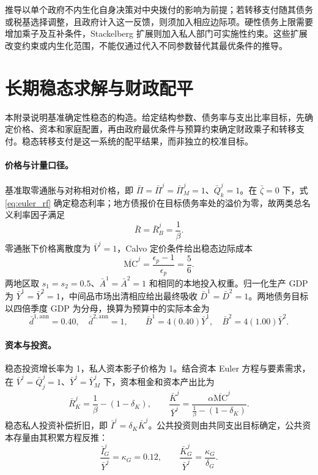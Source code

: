 \documentclass[12pt,UTF8]{ctexart}
\newcommand{\MC}{\mathrm{MC}}
\begin{document}
	推导以单个政府不内生化自身决策对中央拨付的影响为前提；若转移支付随其债务或税基选择调整，且政府计入这一反馈，则须加入相应边际项。硬性债务上限需要增加乘子及互补条件，Stackelberg 扩展则加入私人部门可实施性约束。这些扩展改变约束或内生化范围，不能仅通过代入不同参数替代其最优条件的推导。
	
	\section{长期稳态求解与财政配平}
	\label{app:steady_state}
	
	本附录说明基准确定性稳态的构造。给定结构参数、债务率与支出比率目标，先确定价格、资本和家庭配置，再由政府最优条件与预算约束确定财政乘子和转移支付。稳态转移支付是这一系统的配平结果，而非独立的校准目标。
	
	\paragraph{价格与计量口径。}
	基准取零通胀与对称相对价格，即 $\bar\Pi=\bar\Pi^j=\bar\Pi_M^j=1$、$\bar Q_k^j=1$。在 $\bar\zeta=0$ 下，式 \eqref{eq:euler_rf} 确定稳态利率；地方债报价在目标债务率处的溢价为零，故两类总名义利率因子满足
	\begin{equation}
		\bar{R} = \bar{R}_B^j = \frac{1}{\beta}.
	\end{equation}
	零通胀下价格离散度为 $\bar V^j=1$，Calvo 定价条件给出稳态边际成本
	\begin{equation}
		\overline{\MC}^j = \frac{\epsilon_p-1}{\epsilon_p} = \frac{5}{6}.
	\end{equation}
	两地区取 $s_1=s_2=0.5$、$\bar A^1=\bar A^2=1$ 和相同的本地投入权重。归一化生产 GDP 为 $\bar Y^1=\bar Y^2=1$，中间品市场出清相应给出最终吸收 $\bar D^1=\bar D^2=1$。两地债务目标以四倍季度 GDP 为分母，换算为预算中的实际本金为
	\begin{equation}
		\bar d^{1,\mathrm{ann}}=0.40,\quad \bar d^{2,\mathrm{ann}}=1,\qquad
		\bar B^1=4(0.40)\bar Y^1,\quad
		\bar B^2=4(1.00)\bar Y^2.
		\label{eq:ss_debt_frequency}
	\end{equation}
	
	\paragraph{资本与投资。}
	稳态投资增长率为 1，私人资本影子价格为 1。结合资本 Euler 方程与要素需求，在 $\bar V^j=\bar Q_j^j=1$、$\bar Y^j=\bar Y_M^j$ 下，资本租金和资本产出比为
	\begin{equation}
		\bar R_K^j=\frac1\beta-(1-\delta_K),\qquad
		\frac{\bar K^j}{\bar Y^j}
		=\frac{\alpha\overline{\MC}^j}{\frac1\beta-(1-\delta_K)}.
	\end{equation}
	稳态私人投资补偿折旧，即 $\bar I^j=\delta_K\bar K^j$。公共投资则由共同支出目标确定，公共资本存量由其积累方程反推：
	\begin{equation}
		\frac{\bar I_G^j}{\bar Y^j}=\kappa_G=0.12,\qquad
		\frac{\bar K_G^j}{\bar Y^j}=\frac{\kappa_G}{\delta_G}.
	\end{equation}
\end{document}
